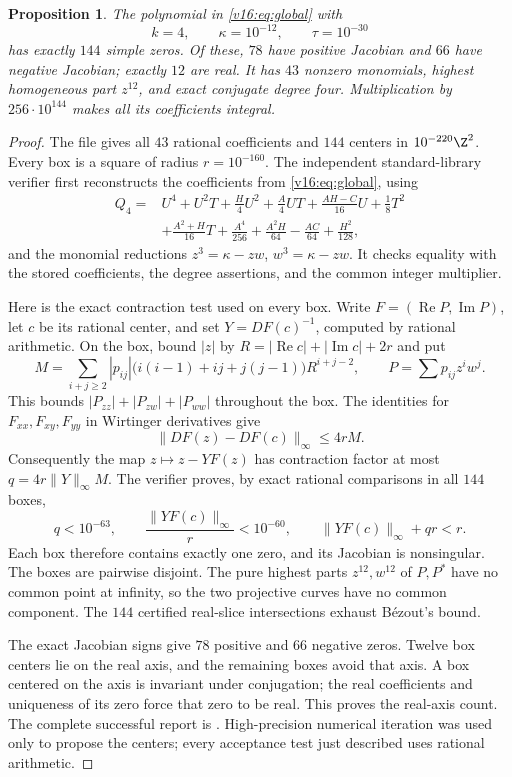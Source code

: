 \documentclass[UTF8,11pt]{ctexart}
\newtheorem{prop}[thm]{Proposition}
\theoremstyle{definition}
\numberwithin{equation}{section}
\DeclareMathOperator{\Rea}{Re}\DeclareMathOperator{\Ima}{Im}
\begin{document}
\begin{prop}\label{v17:prop:144}
The polynomial in \eqref{v16:eq:global} with
\[
 k=4,\qquad \kappa=10^{-12},\qquad \tau=10^{-30}
\]
has exactly $144$ simple zeros. Of these, $78$ have positive
Jacobian and $66$ have negative Jacobian; exactly $12$ are real.
It has $43$ nonzero monomials, highest homogeneous part $z^{12}$,
and exact conjugate degree four. Multiplication by
$256\cdot10^{144}$ makes all its coefficients integral.
\end{prop}
\begin{proof}
The file  gives all $43$
rational coefficients and $144$ centers in $10^{-220}\Z^2$.
Every box is a square of radius $r=10^{-160}$. The independent
standard-library verifier  first
reconstructs the coefficients from \eqref{v16:eq:global}, using
\[
\begin{split}
 Q_4={}&U^4+U^2T+\frac H4U^2+\frac A4UT
       +\frac{AH-C}{16}U+\frac18T^2\\
      &+\frac{A^2+H}{16}T
       +\frac{A^4}{256}+\frac{A^2H}{64}
       -\frac{AC}{64}+\frac{H^2}{128},
\end{split}
\]
and the monomial reductions $z^3=\kappa-zw$,
$w^3=\kappa-zw$. It checks equality with the stored coefficients,
the degree assertions, and the common integer multiplier.

Here is the exact contraction test used on every box. Write
$F=(\Rea P,\Ima P)$, let $c$ be its rational center, and set
$Y=DF(c)^{-1}$, computed by rational arithmetic. On the box,
bound $|z|$ by $R=|\Rea c|+|\Ima c|+2r$ and put
\[
 M=\sum_{i+j\ge2}|p_{ij}|
      \bigl(i(i-1)+ij+j(j-1)\bigr)R^{i+j-2},
 \qquad P=\sum p_{ij}z^iw^j.
\]
This bounds $|P_{zz}|+|P_{zw}|+|P_{ww}|$ throughout the box.
The identities for $F_{xx},F_{xy},F_{yy}$ in Wirtinger
derivatives give
\[
 \|DF(z)-DF(c)\|_\infty\le4rM.
\]
Consequently the map $z\mapsto z-YF(z)$ has contraction factor
at most $q=4r\|Y\|_\infty M$. The verifier proves, by exact
rational comparisons in all $144$ boxes,
\[
 q<10^{-63},\qquad
 \frac{\|YF(c)\|_\infty}{r}<10^{-60},\qquad
 \|YF(c)\|_\infty+qr<r.
\]
Each box therefore contains exactly one zero, and its Jacobian
is nonsingular. The boxes are pairwise disjoint. The pure
highest parts $z^{12},w^{12}$ of $P,P^*$ have no common point
at infinity, so the two projective curves have no common
component. The $144$ certified real-slice intersections exhaust
B\'ezout's bound.

The exact Jacobian signs give $78$ positive and $66$ negative
zeros. Twelve box centers lie on the real axis, and the remaining
boxes avoid that axis. A box centered on the axis is invariant
under conjugation; the real coefficients and uniqueness of its
zero force that zero to be real. This proves the real-axis count.
The complete successful report is
. High-precision numerical
iteration was used only to propose the centers; every acceptance
test just described uses rational arithmetic.
\end{proof}
\end{document}
